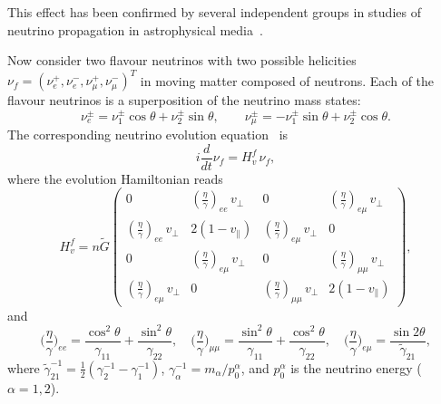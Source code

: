 \documentclass[a4paper,11pt]{article}
\begin{document}
This effect has been confirmed by several independent groups in studies of neutrino propagation in astrophysical media~\cite{Serreau:Volpe:2014PRD,Cirigliano:2015PLB,Kartavtsev:2015PRD}.

Now consider two flavour neutrinos with two possible helicities $\nu_f = (\nu_e^+, \nu_e^-, \nu_\mu^+, \nu_\mu^-)^T$ in moving matter composed of neutrons. Each of the flavour neutrinos is a superposition of the neutrino mass states:
\begin{equation}
\nu_e^\pm = \nu_1^\pm\cos\theta + \nu_2^\pm\sin\theta, \qquad \nu_\mu^\pm = -\nu_1^\pm\sin\theta + \nu_2^\pm\cos\theta.
\end{equation}
The corresponding neutrino evolution equation~\cite{Pustoshny:Studenikin:2018PRD,Studenikin:2019arXiv} is
\begin{equation}
i\frac{d}{dt}\nu_f = H_v^f\,\nu_f,
\end{equation}
where the evolution Hamiltonian reads
\begin{equation}
\label{eq:H_4x4}
H_v^f = n\tilde{G}\begin{pmatrix}
0 & (\frac{\eta}{\gamma})_{ee}\,v_\perp & 0 & (\frac{\eta}{\gamma})_{e\mu}\,v_\perp \\
(\frac{\eta}{\gamma})_{ee}\,v_\perp & 2(1-v_\parallel) & (\frac{\eta}{\gamma})_{e\mu}\,v_\perp & 0 \\
0 & (\frac{\eta}{\gamma})_{e\mu}\,v_\perp & 0 & (\frac{\eta}{\gamma})_{\mu\mu}\,v_\perp \\
(\frac{\eta}{\gamma})_{e\mu}\,v_\perp & 0 & (\frac{\eta}{\gamma})_{\mu\mu}\,v_\perp & 2(1-v_\parallel)
\end{pmatrix},
\end{equation}
and
\begin{equation}
\Big(\frac{\eta}{\gamma}\Big)_{ee} = \frac{\cos^2\theta}{\gamma_{11}} + \frac{\sin^2\theta}{\gamma_{22}}, \quad \Big(\frac{\eta}{\gamma}\Big)_{\mu\mu} = \frac{\sin^2\theta}{\gamma_{11}} + \frac{\cos^2\theta}{\gamma_{22}}, \quad \Big(\frac{\eta}{\gamma}\Big)_{e\mu} = \frac{\sin 2\theta}{\tilde{\gamma}_{21}},
\end{equation}
where $\tilde{\gamma}_{21}^{-1} = \frac{1}{2}(\gamma_2^{-1} - \gamma_1^{-1})$, $\gamma_\alpha^{-1} = m_\alpha/p_0^\alpha$, and $p_0^\alpha$ is the neutrino energy ($\alpha = 1,2$).
\end{document}
